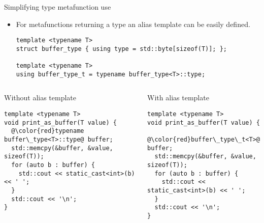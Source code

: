 \begin{frame}[t,fragile]{Simplifying type metafunction use}
\begin{itemize}
  \item For metafunctions returning a type an alias template can be easily defined.
\begin{lstlisting}
template <typename T>
struct buffer_type { using type = std::byte[sizeof(T)]; };

template <typename T>
using buffer_type_t = typename buffer_type<T>::type;
\end{lstlisting}
\end{itemize}

\begin{columns}[T]

\begin{block}{Without alias template}
\begin{lstlisting}[basicstyle=\mode<presentation>{\tiny},escapechar=@]
template <typename T>
void print_as_buffer(T value) {
  @\color{red}typename buffer\_type<T>::type@ buffer;
  std::memcpy(&buffer, &value, sizeof(T));
  for (auto b : buffer) {
    std::cout << static_cast<int>(b) << ' ';
  }
  std::cout << '\n';
}
\end{lstlisting}
\end{block}

\begin{block}{With alias template}
\begin{lstlisting}[basicstyle=\mode<presentation>{\tiny},escapechar=@]
template <typename T>
void print_as_buffer(T value) {
  @\color{red}buffer\_type\_t<T>@ buffer;
  std::memcpy(&buffer, &value, sizeof(T));
  for (auto b : buffer) {
    std::cout << static_cast<int>(b) << ' ';
  }
  std::cout << '\n';
}
\end{lstlisting}
\end{block}

\end{columns}
\end{frame}

